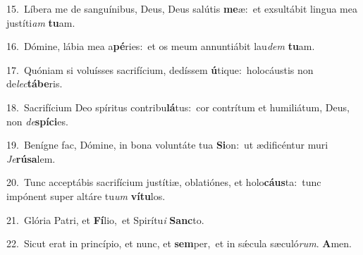 {\numbfont\textcolor{\numbcolor}{15.}}~Líbera me de sanguínibus, Deus, Deus salútis \textbf{me}\-æ:~\star et exsultábit lingua mea justíti\textit{am} \textbf{tu}\-am.\par
{\numbfont\textcolor{\numbcolor}{16.}}~Dómine, lábia mea a\-\textbf{pé}\-ries:~\star et os meum annuntiábit lau\textit{dem} \textbf{tu}\-am.\par
{\numbfont\textcolor{\numbcolor}{17.}}~Quóniam si voluísses sacrifícium, dedíssem \textbf{ú}\-tique:~\star holocáustis non de\-\textit{lec}\-\textbf{tá}\textbf{be}ris.\par
{\numbfont\textcolor{\numbcolor}{18.}}~Sacrifícium Deo spíritus contribu\-\textbf{lá}\-tus:~\star cor contrítum et humiliátum, Deus, non \textit{de}\-\textbf{spí}\textbf{ci}es.\par
{\numbfont\textcolor{\numbcolor}{19.}}~Benígne fac, Dómine, in bona voluntáte tua \textbf{Si}\-on:~\star ut ædificéntur muri \textit{Je}\-\textbf{rú}\textbf{sa}lem.\par
{\numbfont\textcolor{\numbcolor}{20.}}~Tunc acceptábis sacrifícium justítiæ, oblatiónes, et holo\-\textbf{cáus}\-ta:~\star tunc impónent super altáre tu\textit{um} \textbf{ví}\-\textbf{tu}los.\par
{\numbfont\textcolor{\numbcolor}{21.}}~Glória Patri, et \textbf{Fí}\-lio,~\star et Spirítu\textit{i} \textbf{Sanc}\-to.\par
{\numbfont\textcolor{\numbcolor}{22.}}~Sicut erat in princípio, et nunc, et \textbf{sem}\-per,~\star et in sǽcula sæculó\-\textit{rum}\-. \textbf{A}\-men.\par
